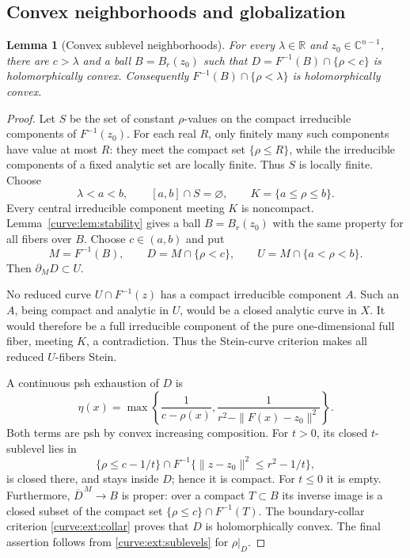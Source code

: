 \documentclass[11pt]{amsart}
\newtheorem{lemma}[theorem]{Lemma}
\theoremstyle{definition}
\theoremstyle{remark}
\numberwithin{equation}{section}
\newcommand{\C}{\mathbb C}
\begin{document}
\subsection{Convex neighborhoods and globalization}
\begin{lemma}[Convex sublevel neighborhoods]\label{curve:lem:neighborhood}
For every \(\lambda\in\mathbb R\) and \(z_0\in\C^{n-1}\), there
are \(c>\lambda\) and a ball \(B=B_r(z_0)\) such that
\(D=F^{-1}(B)\cap\{\rho<c\}\) is holomorphically convex.
Consequently \(F^{-1}(B)\cap\{\rho<\lambda\}\) is holomorphically convex.
\end{lemma}
\begin{proof}
Let \(S\) be the set of constant \(\rho\)-values on the compact
irreducible components of \(F^{-1}(z_0)\).
For each real \(R\), only finitely many such components have value
at most \(R\): they meet the compact set \(\{\rho\leq R\}\),
while the irreducible components of a fixed analytic set are
locally finite. Thus \(S\) is locally finite.
Choose
\[
 \lambda<a<b,\qquad [a,b]\cap S=\varnothing,\qquad
 K=\{a\leq\rho\leq b\}.
\]
Every central irreducible component meeting \(K\) is noncompact.
Lemma~\ref{curve:lem:stability} gives a ball \(B=B_r(z_0)\) with the
same property for all fibers over \(B\).
Choose \(c\in(a,b)\) and put
\[
 M=F^{-1}(B),\qquad D=M\cap\{\rho<c\},\qquad
 U=M\cap\{a<\rho<b\}.
\]
Then \(\partial_M D\subset U\).

No reduced curve \(U\cap F^{-1}(z)\) has a compact irreducible
component \(A\). Such an \(A\), being compact and analytic in \(U\),
would be a closed analytic curve in \(X\). It would therefore be
a full irreducible component of the pure one-dimensional full fiber,
meeting \(K\), a contradiction.
Thus the Stein-curve criterion makes all reduced \(U\)-fibers Stein.

A continuous psh exhaustion of \(D\) is
\[
 \eta(x)=\max\left\{\frac1{c-\rho(x)},
                    \frac1{r^2-\|F(x)-z_0\|^2}\right\}.
\]
Both terms are psh by convex increasing composition.
For \(t>0\), its closed \(t\)-sublevel lies in
\[
 \{\rho\leq c-1/t\}\cap
 F^{-1}\{\|z-z_0\|^2\leq r^2-1/t\},
\]
is closed there, and stays inside \(D\); hence it is compact.
For \(t\leq0\) it is empty.
Furthermore, \(\overline D^{\,M}\to B\) is proper:
over a compact \(T\subset B\) its inverse image is a closed
subset of the compact set \(\{\rho\leq c\}\cap F^{-1}(T)\).
The boundary-collar criterion \ref{curve:ext:collar} proves that \(D\)
is holomorphically convex.
The final assertion follows from \ref{curve:ext:sublevels} for \(\rho|_D\).
\end{proof}
\end{document}
